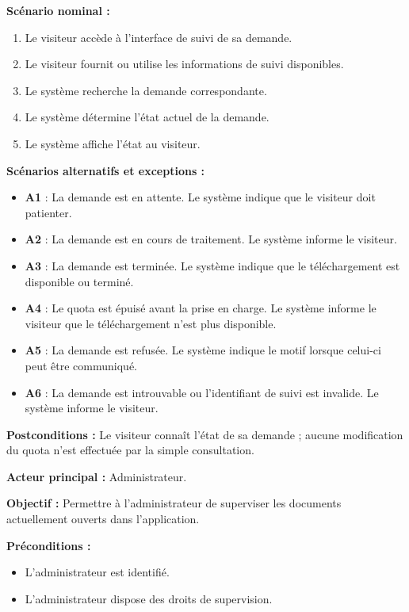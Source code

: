 \begin{description}[leftmargin=0pt, style=nextline, font=\normalfont\bfseries\color{violetprincipal}]
    \textbf{Scénario nominal :}
    \begin{enumerate}
        \item Le visiteur accède à l'interface de suivi de sa demande.
        \item Le visiteur fournit ou utilise les informations de suivi disponibles.
        \item Le système recherche la demande correspondante.
        \item Le système détermine l'état actuel de la demande.
        \item Le système affiche l'état au visiteur.
    \end{enumerate}

    \textbf{Scénarios alternatifs et exceptions :}
    \begin{itemize}
        \item \textbf{A1} : La demande est en attente. Le système indique que le visiteur doit patienter.
        \item \textbf{A2} : La demande est en cours de traitement. Le système informe le visiteur.
        \item \textbf{A3} : La demande est terminée. Le système indique que le téléchargement est disponible ou terminé.
        \item \textbf{A4} : Le quota est épuisé avant la prise en charge. Le système informe le visiteur que le téléchargement n'est plus disponible.
        \item \textbf{A5} : La demande est refusée. Le système indique le motif lorsque celui-ci peut être communiqué.
        \item \textbf{A6} : La demande est introuvable ou l'identifiant de suivi est invalide. Le système informe le visiteur.
    \end{itemize}

    \textbf{Postconditions :} Le visiteur connaît l'état de sa demande ; aucune modification du quota n'est effectuée par la simple consultation.

    \item[UC10 --- Consulter les documents ouverts]

    \textbf{Acteur principal :} Administrateur.

    \textbf{Objectif :} Permettre à l'administrateur de superviser les documents actuellement ouverts dans l'application.

    \textbf{Préconditions :}
    \begin{itemize}
        \item L'administrateur est identifié.
        \item L'administrateur dispose des droits de supervision.
    \end{itemize}


\end{description}
